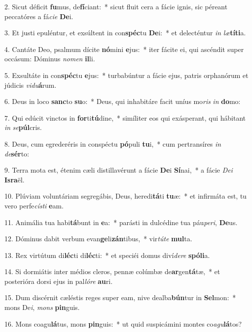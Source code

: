 2. Sicut déficit \textbf{fu}mus, de\textbf{fí}ciant:~*  sicut fluit cera a fácie ignis, sic péreant peccatóres a fá\textit{ci}\textit{e} \textbf{De}i.\

3. Et justi epuléntur, et exsúltent in con\textbf{spéc}tu \textbf{De}i:~*  et delecténtur \textit{in} \textit{læ}\textbf{tí}\textbf{ti}a.\

4. Cantáte Deo, psalmum dícite \textbf{nó}mini \textbf{e}jus:~*  iter fácite ei, qui ascéndit super occásum: Dóminus \textit{no}\textit{men} \textbf{il}li.\

5. Exsultáte in con\textbf{spéc}tu \textbf{e}jus:~*  turbabúntur a fácie ejus, patris orphanórum et júdicis \textit{vi}\textit{du}\textbf{á}rum.\

6. Deus in loco \textbf{sanc}to \textbf{su}o:~*  Deus, qui inhabitáre facit uníus mo\textit{ris} \textit{in} \textbf{do}mo:\

7. Qui edúcit vinctos in \textbf{for}ti\textbf{tú}dine,~*  simíliter eos qui exásperant, qui hábitant \textit{in} \textit{se}\textbf{púl}cris.\

8. Deus, cum egrederéris in conspéctu \textbf{pó}puli \textbf{tu}i,~*  cum pertransíres \textit{in} \textit{de}\textbf{sér}to:\

9. Terra mota est, étenim cæli distillavérunt a fácie \textbf{De}i \textbf{Sí}nai,~*  a fácie \textit{De}\textit{i} \textbf{Is}\textbf{ra}ël.\

10. Plúviam voluntáriam segregábis, Deus, heredi\textbf{tá}ti \textbf{tu}æ:~*  et infirmáta est, tu vero perfe\textit{cís}\textit{ti} \textbf{e}am.\

11. Animália tua habi\textbf{tá}bunt in \textbf{e}a:~*  parásti in dulcédine tua páu\textit{pe}\textit{ri}, \textbf{De}us.\

12. Dóminus dabit verbum evan\textbf{ge}li\textbf{zán}tibus,~*  vir\textit{tú}\textit{te} \textbf{mul}ta.\

13. Rex virtútum di\textbf{léc}ti di\textbf{léc}ti:~*  et speciéi domus diví\textit{de}\textit{re} \textbf{spó}\textbf{li}a.\

14. Si dormiátis inter médios cleros, pennæ colúmbæ de\textbf{ar}gen\textbf{tá}tæ,~*  et posterióra dorsi ejus in pal\textit{ló}\textit{re} \textbf{au}ri.\

15. Dum discérnit cæléstis reges super eam, nive dealba\textbf{bún}tur in \textbf{Sel}mon:~*  mons De\textit{i}, \textit{mons} \textbf{pin}guis.\

16. Mons coagu\textbf{lá}tus, mons \textbf{pin}guis:~*  ut quid suspicámini montes co\textit{a}\textit{gu}\textbf{lá}tos?\

